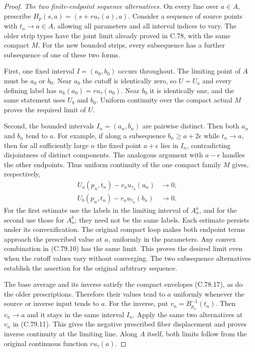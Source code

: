 \begin{proof}
\emph{The two finite-endpoint sequence alternatives.}
On every line over $a\in A$, prescribe
$H_p(s,a)=(s+r u_\tau(a),a)$.
Consider a sequence of source points with
$t_n\to a\in A$, allowing all parameters
and all interval indices to vary. The older
strip types have the joint limit already
proved in C.78, with the same compact $M$.
For the new bounded strips, every subsequence
has a further subsequence of one of these
two forms.

First, one fixed interval $I=(a_0,b_0)$
occurs throughout. The limiting point of
$A$ must be $a_0$ or $b_0$.
Near $a_0$ the cutoff is identically zero,
so $U=U_a$ and every defining label has
$u_k(a_0)=r u_\tau(a_0)$.
Near $b_0$ it is identically one, and the
same statement uses $U_b$ and $b_0$.
Uniform continuity over the compact actual
$M$ proves the required limit of $U$.

Second, the bounded intervals
$I_n=(a_n,b_n)$ are pairwise distinct.
Then both $a_n$ and $b_n$ tend to $a$.
For example, if along a subsequence
$b_n\geq a+2\epsilon$ while $t_n\to a$,
then for all sufficiently large $n$ the
fixed point $a+\epsilon$ lies in $I_n$,
contradicting disjointness of distinct
components. The analogous argument with
$a-\epsilon$ handles the other endpoints.
Thus uniform continuity of the one compact
family $M$ gives, respectively,
\[
 \begin{split}
 U_a(p_n,t_n)-r_nu_{\tau_n}(a_n)&\longrightarrow0,\\
 U_b(p_n,t_n)-r_nu_{\tau_n}(b_n)&\longrightarrow0.
 \end{split}                                                   \tag{C.79.13}
\]
For the first estimate use the labels in
the limiting interval of $A_n^a$, and for
the second use those for $A_n^b$; they
need not be the same labels. Each estimate
persists under its convexification.
The original compact loop makes both
endpoint terms approach the prescribed
value at $a$, uniformly in the parameters.
Any convex combination in (C.79.10) has
the same limit. This proves the desired
limit even when the cutoff values vary
without converging. The two subsequence
alternatives establish the assertion for
the original arbitrary sequence.

The base average and its inverse satisfy
the compact envelopes (C.78.17), as do
the older prescriptions. Therefore their
values tend to $a$ uniformly whenever
the source or inverse input tends to $a$.
For the inverse, put $v_n=B_{p_n}^{-1}(t_n)$.
Then $v_n\to a$ and it stays in the same
interval $I_n$. Apply the same two
alternatives at $v_n$ in (C.79.11).
This gives the negative prescribed fiber
displacement and proves inverse continuity
at the limiting line. Along $A$ itself,
both limits follow from the original
continuous function $r u_\tau(a)$.


\end{proof}
